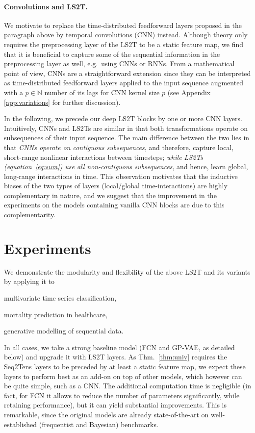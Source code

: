 \documentclass{article} \usepackage{iclr2021_conference,times}
\def\eqref#1{equation~\ref{#1}}
\newcommand{\NN}{\mathbb{N}}
\theoremstyle{plain}
\theoremstyle{definition}
\begin{document}
\paragraph{Convolutions and LS2T.} We motivate to replace the time-distributed feedforward layers proposed in the paragraph above by temporal convolutions (CNN) instead. Although theory only requires the preprocessing layer of the LS2T to be a static feature map, we find that it is beneficial to capture some of the sequential information in the preprocessing layer as well, e.g.~using CNNs or RNNs. From a mathematical point of view, CNNs are a straightforward extension since they can be interpreted as time-distributed feedforward layers applied to the input sequence augmented with a $p \in \NN$ number of its lags for CNN kernel size $p$ (see Appendix \ref{app:variations} for further discussion). 

In the following, we precede our deep LS2T blocks by one or more CNN layers. Intuitively, CNNs and LS2Ts are similar in that both transformations operate on subsequences of their input sequence. The main difference between the two lies in that \emph{CNNs operate on contiguous subsequences}, and therefore, capture local, short-range nonlinear interactions between timesteps; \emph{while LS2Ts (\eqref{eq:sum}) use all non-contiguous subsequences}, and hence, learn global, long-range interactions in time. This observation motivates that the inductive biases of the two types of layers (local/global time-interactions) are highly complementary in nature, and we suggest that the improvement in the experiments on the models containing vanilla CNN blocks are due to this complementarity. 













\section{Experiments}\label{sec:5}
We demonstrate the modularity and flexibility of the above LS2T and its variants by applying it to 
\begin{enumerate*}[label=(\roman*)] 
\item  multivariate time series classification,
\item mortality prediction in healthcare, 
\item  generative modelling of sequential data. 
\end{enumerate*}
In all cases, we take a strong baseline model (FCN and GP-VAE, as detailed below) and upgrade it with LS2T layers. As Thm.~\ref{thm:univ} requires the Seq2Tens layers to be preceded by at least a static feature map, we expect these layers to perform best as an add-on on top of other models, which however can be quite simple, such as a CNN. The additional computation time is negligible (in fact, for FCN it allows to reduce the number of parameters significantly, while retaining performance), but it can yield substantial improvements.
This is remarkable, since the original models are already state-of-the-art on well-established (frequentist and Bayesian) benchmarks. 
\end{document}
